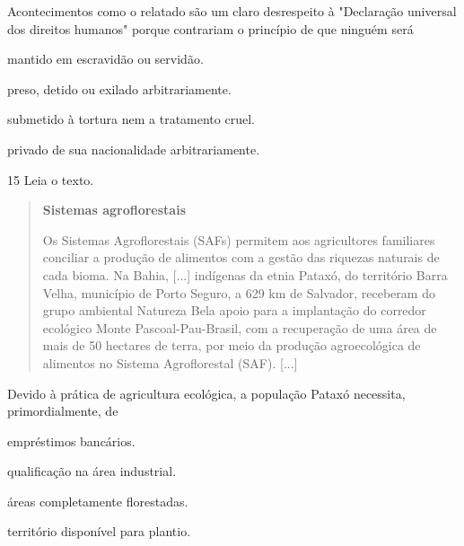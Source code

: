 Acontecimentos como o relatado são um claro desrespeito à "Declaração
universal dos direitos humanos" porque contrariam o princípio de que ninguém será

\begin{escolha}
\item  mantido em escravidão ou servidão.

\item  preso, detido ou exilado arbitrariamente.

\item  submetido à tortura nem a tratamento cruel.

\item  privado de sua nacionalidade arbitrariamente.
\end{escolha}


\num{15} Leia o texto.

\begin{quote}
\textbf{Sistemas agroflorestais}

Os Sistemas Agroflorestais (SAFs) permitem aos agricultores familiares conciliar a produção de alimentos com a gestão das riquezas naturais de cada bioma. Na Bahia, {[}...{]} indígenas da etnia Pataxó, do território Barra Velha, município de Porto Seguro, a 629 km de Salvador, receberam do grupo ambiental Natureza Bela apoio para a implantação do corredor ecológico Monte Pascoal-Pau-Brasil, com a recuperação de uma área de mais de 50 hectares de terra, por meio da produção agroecológica de alimentos no Sistema Agroflorestal (SAF). {[}...{]}

\end{quote}

\pagebreak
Devido à prática de agricultura ecológica, a população Pataxó necessita,
primordialmente, de

\begin{escolha}
\item  empréstimos bancários.

\item  qualificação na área industrial.

\item  áreas completamente florestadas.

\item  território disponível para plantio.
\end{escolha}


